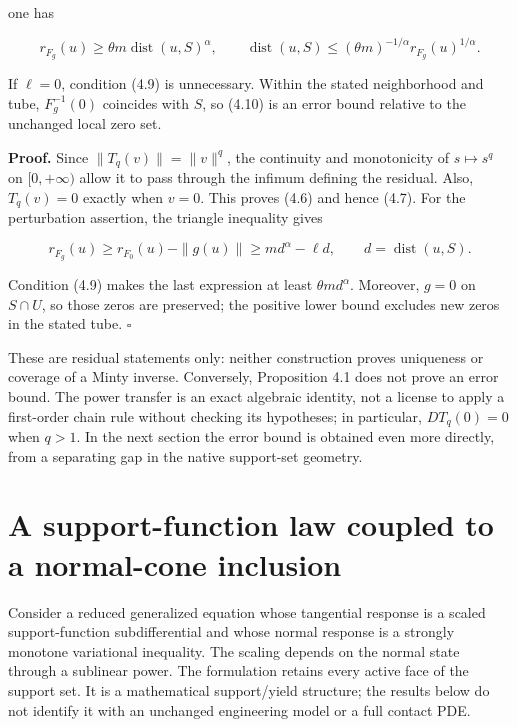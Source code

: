 \documentclass[11pt,a4paper]{article}
\theoremstyle{plain}
\theoremstyle{definition}
\theoremstyle{remark}
\begin{document}
one has

\[
r_{F_g}(u)\ge\theta m\operatorname{dist}(u,S)^\alpha,
\qquad
\operatorname{dist}(u,S)
\le(\theta m)^{-1/\alpha}r_{F_g}(u)^{1/\alpha}.
\tag{4.10}
\]

If \(\ell=0\), condition (4.9) is unnecessary. Within the stated
neighborhood and tube, \(F_g^{-1}(0)\) coincides with \(S\), so (4.10)
is an error bound relative to the unchanged local zero set.

\textbf{Proof.} Since \(\|T_q(v)\|=\|v\|^q\), the continuity and
monotonicity of \(s\mapsto s^q\) on \([0,+\infty)\) allow it to pass
through the infimum defining the residual. Also, \(T_q(v)=0\) exactly
when \(v=0\). This proves (4.6) and hence (4.7). For the perturbation
assertion, the triangle inequality gives

\[
r_{F_g}(u)\ge r_{F_0}(u)-\|g(u)\|
\ge m d^\alpha-\ell d,
\qquad d=\operatorname{dist}(u,S).
\]

Condition (4.9) makes the last expression at least
\(\theta m d^\alpha\). Moreover, \(g=0\) on \(S\cap U\), so those zeros
are preserved; the positive lower bound excludes new zeros in the stated
tube. \(\square\)

These are residual statements only: neither construction proves
uniqueness or coverage of a Minty inverse. Conversely, Proposition 4.1
does not prove an error bound. The power transfer is an exact algebraic
identity, not a license to apply a first-order chain rule without
checking its hypotheses; in particular, \(DT_q(0)=0\) when \(q>1\). In
the next section the error bound is obtained even more directly, from a
separating gap in the native support-set geometry.

\hypertarget{a-support-function-law-coupled-to-a-normal-cone-inclusion}{%
\section{A support-function law coupled to a normal-cone
inclusion}\label{a-support-function-law-coupled-to-a-normal-cone-inclusion}}

Consider a reduced generalized equation whose tangential response is a
scaled support-function subdifferential and whose normal response is a
strongly monotone variational inequality. The scaling depends on the
normal state through a sublinear power. The formulation retains every
active face of the support set. It is a mathematical support/yield
structure; the results below do not identify it with an unchanged
engineering model or a full contact PDE.
\end{document}
